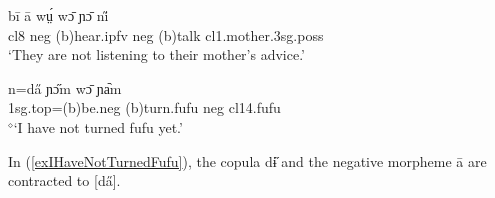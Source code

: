 \documentclass[10pt,twoside]{article}
\def\ci#1{{\ipaFont #1}}
\newcommand{\gl}[1]{`#1'}
\def\VSP{\vspace{0pt}}
\newcommand{\cl}[1]{{\sc cl#1}}
\newcommand{\pref}[1]{(\ref{#1})}
\def\elicited{$^\diamond$}
\newcommand{\comment}[1]{\textcolor{blue}{\emph{#1}}}
\begin{document}
%
%
%
\begin{exe} 
	\ex \label{exTheyAreNotListening}	
	
		\gll 	bī ā wṳ́ wɔ̄ ɲɔ̄ ni̋	\\
		 	\cl8  {\sc neg} ({\sc b})hear.{\sc ipfv} 	{\sc neg} ({\sc b})talk	\cl1.mother.{\sc 3sg.poss} \\
		\glt \VSP \gl{They are not listening to their mother's advice\footnotemark.}
\end{exe}%


\begin{exe} 
	\ex \label{exIHaveNotTurnedFufu}	

		\gll 	n=da̋ ɲɔ̋m wɔ̄ ɲa᷆m	\\
		 	{\sc 1sg.top}=({\sc b})be.{\sc neg} ({\sc b})turn.fufu  {\sc neg} \cl14.fufu	\\
		\glt \VSP \elicited \gl{I have not turned fufu yet.}
\end{exe}%


\noindent
In \pref{exIHaveNotTurnedFufu}, the copula \ci{dɨ̋} and the negative morpheme \ci{ā} are contracted to [\ci{da̋}].
\end{document}
